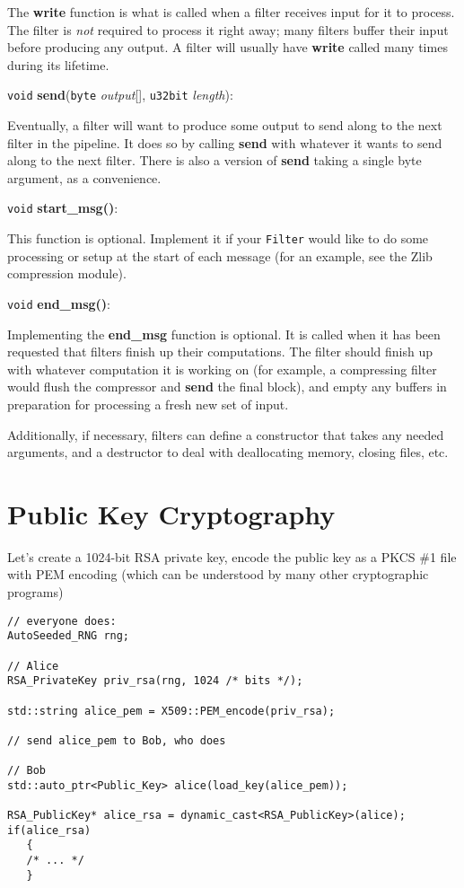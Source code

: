 \documentclass{article}
\newcommand{\function}[1]{\textbf{#1}}
\newcommand{\type}[1]{\texttt{#1}}
\renewcommand{\arg}[1]{\textsl{#1}}
\begin{document}
The \function{write} function is what is called when a filter receives input
for it to process. The filter is \emph{not} required to process it right away;
many filters buffer their input before producing any output. A filter will
usually have \function{write} called many times during its lifetime.

\noindent
\type{void} \function{send}(\type{byte} \arg{output}[], \type{u32bit}
\arg{length}):

Eventually, a filter will want to produce some output to send along to the next
filter in the pipeline. It does so by calling \function{send} with whatever it
wants to send along to the next filter. There is also a version of
\function{send} taking a single byte argument, as a convenience.

\noindent
\type{void} \function{start\_msg()}:

This function is optional. Implement it if your \type{Filter} would like to do
some processing or setup at the start of each message (for an example, see the
Zlib compression module).

\noindent
\type{void} \function{end\_msg()}:

Implementing the \function{end\_msg} function is optional. It is
called when it has been requested that filters finish up their
computations. The filter should finish up with whatever computation it
is working on (for example, a compressing filter would flush the
compressor and \function{send} the final block), and empty any buffers
in preparation for processing a fresh new set of input.

Additionally, if necessary, filters can define a constructor that
takes any needed arguments, and a destructor to deal with deallocating
memory, closing files, etc.

\section{Public Key Cryptography}

Let's create a 1024-bit RSA private key, encode the public key as a
PKCS \#1 file with PEM encoding (which can be understood by many other
cryptographic programs)

\begin{verbatim}
// everyone does:
AutoSeeded_RNG rng;

// Alice
RSA_PrivateKey priv_rsa(rng, 1024 /* bits */);

std::string alice_pem = X509::PEM_encode(priv_rsa);

// send alice_pem to Bob, who does

// Bob
std::auto_ptr<Public_Key> alice(load_key(alice_pem));

RSA_PublicKey* alice_rsa = dynamic_cast<RSA_PublicKey>(alice);
if(alice_rsa)
   {
   /* ... */
   }

\end{verbatim}
\end{document}

